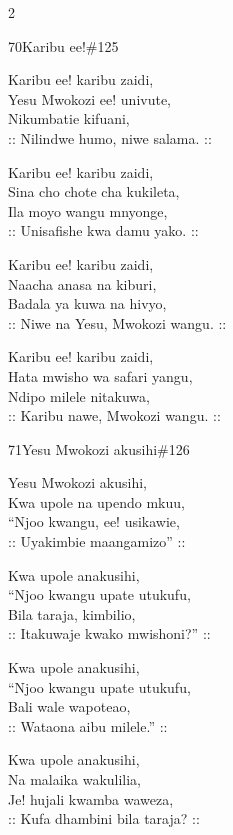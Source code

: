\documentclass{article}
\begin{document}
\begin{multicols}{2}
\begin{hymn}{70}{Karibu ee!}{\#125}
\begin{stanza}
Karibu ee! karibu zaidi,\\
Yesu Mwokozi ee! univute,\\
Nikumbatie kifuani,\\
:: Nilindwe humo, niwe salama. ::
\end{stanza}
\begin{stanza}
Karibu ee! karibu zaidi,\\
Sina cho chote cha kukileta,\\
Ila moyo wangu mnyonge,\\
:: Unisafishe kwa damu yako. ::
\end{stanza}
\begin{stanza}
Karibu ee! karibu zaidi,\\
Naacha anasa na kiburi,\\
Badala ya kuwa na hivyo,\\
:: Niwe na Yesu, Mwokozi wangu. ::
\end{stanza}
\begin{stanza}
Karibu ee! karibu zaidi,\\
Hata mwisho wa safari yangu,\\
Ndipo milele nitakuwa,\\
:: Karibu nawe, Mwokozi wangu. ::
\end{stanza}
\end{hymn}

\begin{hymn}{71}{Yesu Mwokozi akusihi}{\#126}
\begin{stanza}
Yesu Mwokozi akusihi,\\
Kwa upole na upendo mkuu,\\
``Njoo kwangu, ee! usikawie,\\
:: Uyakimbie maangamizo'' ::
\end{stanza}
\begin{stanza}
Kwa upole anakusihi,\\
``Njoo kwangu upate utukufu,\\
Bila taraja, kimbilio,\\
:: Itakuwaje kwako mwishoni?'' ::
\end{stanza}
\begin{stanza}
Kwa upole anakusihi,\\
``Njoo kwangu upate utukufu,\\
Bali wale wapoteao,\\
:: Wataona aibu milele.'' ::
\end{stanza}
\begin{stanza}
Kwa upole anakusihi,\\
Na malaika wakulilia,\\
Je! hujali kwamba waweza,\\
:: Kufa dhambini bila taraja? ::
\end{stanza}
\end{hymn}


\end{multicols}
\end{document}
